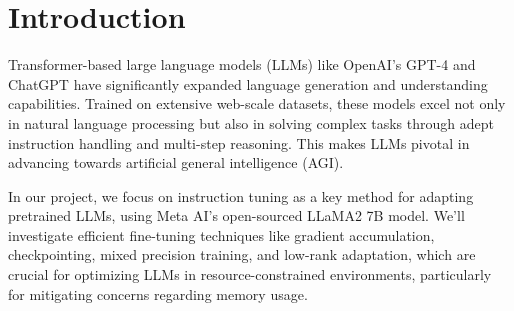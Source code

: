 \section{Introduction}
Transformer-based large language models (LLMs) like OpenAI's GPT-4 and ChatGPT have significantly expanded language generation and understanding capabilities. Trained on extensive web-scale datasets, these models excel not only in natural language processing but also in solving complex tasks through adept instruction handling and multi-step reasoning. This makes LLMs pivotal in advancing towards artificial general intelligence (AGI).

In our project, we focus on instruction tuning as a key method for adapting pretrained LLMs, using Meta AI's open-sourced LLaMA2 7B model. We'll investigate efficient fine-tuning techniques like gradient accumulation, checkpointing, mixed precision training, and low-rank adaptation, which are crucial for optimizing LLMs in resource-constrained environments, particularly for mitigating concerns regarding memory usage.